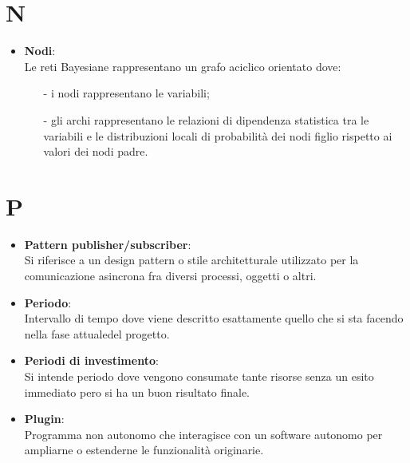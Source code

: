 \documentclass[a4paper, oneside, openany, dvipsnames, table]{article}
\begin{document}
\newpage
\section{N}
\begin{itemize}
\item \textbf{Nodi}:\\	Le reti Bayesiane rappresentano un grafo aciclico orientato dove:
\begin{itemize}
\item[-] i nodi rappresentano le variabili;
\item[-] gli archi rappresentano le relazioni di dipendenza statistica tra le variabili e le distribuzioni locali di probabilità dei nodi figlio rispetto ai valori dei nodi padre.
\end{itemize}
\end{itemize}

\newpage
\section{P}
\begin{itemize}
\item \textbf{Pattern publisher/subscriber}:\\	 Si riferisce a un design pattern o stile architetturale utilizzato per la comunicazione asincrona fra diversi processi, oggetti o altri.
\end{itemize}

\begin{itemize}
\item \textbf{Periodo}:\\	Intervallo di tempo dove viene descritto esattamente quello che si sta facendo nella fase attualedel progetto.
\end{itemize}

\begin{itemize}
\item \textbf{Periodi di investimento}:\\	Si intende periodo dove vengono consumate tante risorse senza un esito immediato pero si ha un buon risultato finale.

\end{itemize}

\begin{itemize}
\item \textbf{Plugin}:\\	Programma non autonomo che interagisce con un software autonomo per ampliarne o estenderne le funzionalità originarie.
\end{itemize}
\end{document}
